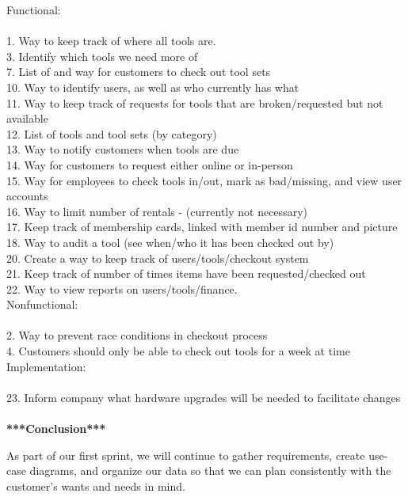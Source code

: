\documentclass[12pt,letterpaper]{article}
\begin{document}
Functional:\\\\
1. Way to keep track of where all tools are.\\
3. Identify which tools we need more of\\
7. List of and way for customers to check out tool sets\\
10. Way to identify users, as well as who currently has what\\
11. Way to keep track of requests for tools that are broken/requested but not available\\
12. List of tools and tool sets (by category)\\
13. Way to notify customers when tools are due\\
14. Way for customers to request either online or in-person\\
15. Way for employees to check tools in/out, mark as bad/missing, and view user accounts\\
16. Way to limit number of rentals - (currently not necessary)\\
17. Keep track of membership cards, linked with member id number and picture\\
18. Way to audit a tool (see when/who it has been checked out by)\\
20. Create a way to keep track of users/tools/checkout system\\
21. Keep track of number of times items have been requested/checked out\\
22. Way to view reports on users/tools/finance.\\

Nonfunctional:\\\\
2. Way to prevent race conditions in checkout process\\
4. Customers should only be able to check out tools for a week at time\\

Implementation:\\\\
23. Inform company what hardware upgrades will be needed to facilitate changes\\\\

\textbf{***Conclusion***}

As part of our first sprint, we will continue to gather requirements, create use-case diagrams, and organize our data so that we can plan consistently with the customer's wants and needs in mind.
\end{document}
